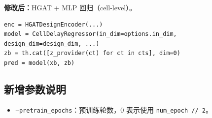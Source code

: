 \documentclass{ctexart}
\begin{document}
\textbf{修改后：}HGAT + MLP 回归（cell-level）。
\begin{lstlisting}
enc = HGATDesignEncoder(...)
model = CellDelayRegressor(in_dim=options.in_dim, design_dim=design_dim, ...)
zb = th.cat([z_provider(ct) for ct in cts], dim=0)
pred = model(xb, zb)
\end{lstlisting}

\subsection{新增参数说明}
\begin{itemize}
  \item \texttt{--pretrain\_epochs}：预训练轮数，0 表示使用 \texttt{num\_epoch // 2}。
\end{itemize}
\end{document}
